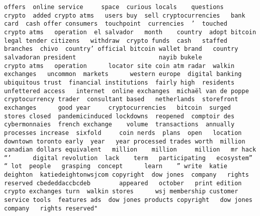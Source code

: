 \documentclass[
]{article}
\begin{document}
\begin{verbatim}
offers  online service     space  curious locals    questions    crypto  added crypto atms   users buy  sell cryptocurrencies   bank card  cash offer consumers  touchpoint  currencies  ’  touched   crypto atms   operation  el salvador   month    country  adopt bitcoin  legal tender citizens   withdraw  crypto funds  cash   staffed branches  chivo  country’ official bitcoin wallet brand   country salvadoran president                       nayib bukele               crypto atms   operation      locator site coin atm radar  walkin exchanges   uncommon  markets      western europe  digital banking  ubiquitous trust  financial institutions  fairly high  residents  unfettered access   internet  online exchanges  michaël van de poppe  cryptocurrency trader  consultant based   netherlands  storefront exchanges      good year     cryptocurrencies   bitcoin  surged  stores closed  pandemicinduced lockdowns  reopened  comptoir des cybermonnaies  french exchange    volume  transactions  annually processes increase  sixfold     coin nerds  plans  open   location  downtown toronto early  year   year processed trades worth  million canadian dollars equivalent   million    million     million   mr hack  “’      digital revolution  lack    term   participating   ecosystem”   “ lot  people   grasping  concept      learn    ” write  katie deighton  katiedeightonwsjcom copyright  dow jones  company   rights reserved cbededdaccbcdeb        appeared   october   print edition  crypto exchanges turn  walkin stores      wsj membership customer service tools  features ads  dow jones products copyright   dow jones  company   rights reserved"                                                                                                                                                                                                                                                                                                                                                                                                                                                                                                                                                                                                                                                                                                                                                                                                                                                                                                                                                                                                                                                                                                                                                                                                                                                                                                                                                                                                                                                                                                                                                                                                                                                                                                                                             
\end{verbatim}
\end{document}
